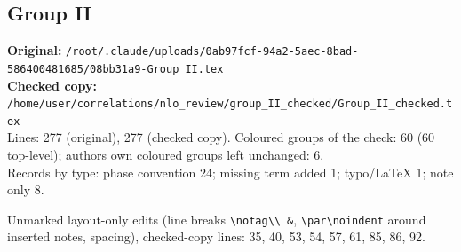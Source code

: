 \documentclass[10pt]{article}
\begin{document}
\subsection{Group II}\label{sec:file-group_II}
\noindent\textbf{Original:} \texttt{/root/.claude/uploads/0ab97fcf-94a2-5aec-8bad-586400481685/08bb31a9-Group\_II.tex}\\\textbf{Checked copy:} \texttt{/home/user/correlations/nlo\_review/group\_II\_checked/Group\_II\_checked.tex}\\
Lines: 277 (original), 277 (checked copy). Coloured groups of the check: 60 (60 top-level); author\textquotesingle s own coloured groups left unchanged: 6.\\
Records by type: phase convention 24; missing term added 1; typo/LaTeX 1; note only 8.
\par\noindent Unmarked layout-only edits (line breaks \texttt{\textbackslash notag\textbackslash\textbackslash\ \&}, \texttt{\textbackslash par\textbackslash noindent} around inserted notes, spacing), checked-copy lines: 35, 40, 53, 54, 57, 61, 85, 86, 92.
\end{document}
